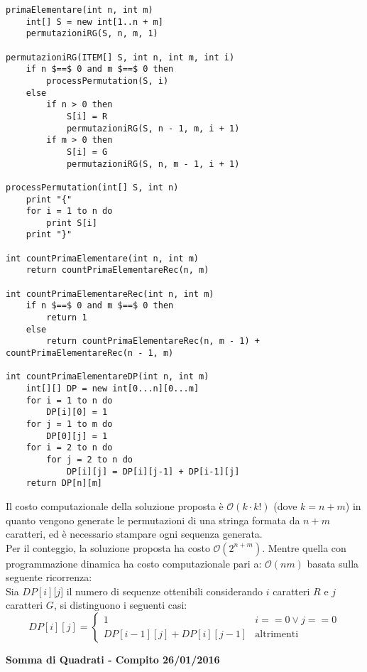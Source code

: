 \documentclass[../cheatSheetAlgoritmi.tex]{subfiles}
\begin{document}
\newpage
\begin{lstlisting}[caption=Permutazioni dei caratteri G e R e conteggio]
primaElementare(int n, int m)
    int[] S = new int[1..n + m]
    permutazioniRG(S, n, m, 1)
        
permutazioniRG(ITEM[] S, int n, int m, int i)
    if n $==$ 0 and m $==$ 0 then
        processPermutation(S, i)
    else 
        if n > 0 then
            S[i] = R
            permutazioniRG(S, n - 1, m, i + 1)
        if m > 0 then
            S[i] = G
            permutazioniRG(S, n, m - 1, i + 1)
                
processPermutation(int[] S, int n) 
    print "{"
    for i = 1 to n do
        print S[i]
    print "}"
    
int countPrimaElementare(int n, int m)
    return countPrimaElementareRec(n, m)
        
int countPrimaElementareRec(int n, int m)
    if n $==$ 0 and m $==$ 0 then
        return 1
    else
        return countPrimaElementareRec(n, m - 1) + countPrimaElementareRec(n - 1, m)

int countPrimaElementareDP(int n, int m)
    int[][] DP = new int[0...n][0...m]
    for i = 1 to n do
        DP[i][0] = 1
    for j = 1 to m do
        DP[0][j] = 1
    for i = 2 to n do
        for j = 2 to n do
            DP[i][j] = DP[i][j-1] + DP[i-1][j]
    return DP[n][m]
\end{lstlisting}
Il costo computazionale della soluzione proposta è $\mathcal{O}(k \cdot k!)$ (dove $k = n + m$) in quanto vengono generate le permutazioni di una stringa formata da $n + m$ caratteri, ed è necessario stampare ogni sequenza generata. \\
Per il conteggio, la soluzione proposta ha costo $\mathcal{O}(2^{n + m})$. Mentre quella con programmazione dinamica ha costo computazionale pari a: $\mathcal{O}(nm)$ basata sulla seguente ricorrenza: \\
Sia $DP[i][j$] il numero di sequenze ottenibili considerando $i$ caratteri $R$ e $j$ caratteri $G$, si distinguono i seguenti casi:
\begin{equation*}
    DP[i][j]=\begin{cases}
        1 & \text{$i == 0 \lor j == 0$}\\
        DP[i-1][j] + DP[i][j-1] & \text{altrimenti} 
    \end{cases}
\end{equation*}
\newpage
\begin{flushleft}
\textbf{Somma di Quadrati - Compito 26/01/2016}
\end{flushleft}
\end{document}
